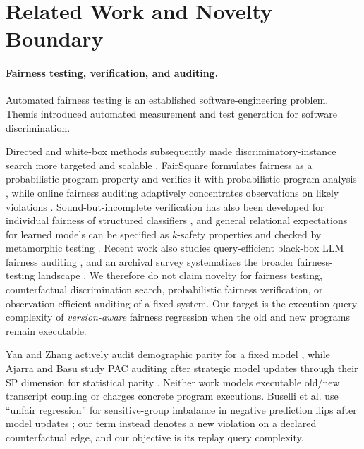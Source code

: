 \section{Related Work and Novelty Boundary}
\label{sec:related}

\paragraph{Fairness testing, verification, and auditing.}
Automated fairness testing is an established software-engineering problem.
Themis \cite{GalhotraBrunMeliou2017} introduced automated measurement and test
generation for software discrimination.

\noindent Directed and white-box methods
subsequently made discriminatory-instance search more targeted and scalable
\cite{UdeshiAroraChattopadhyay2018,ZhangEtAl2020}.  FairSquare formulates
fairness as a probabilistic program property and verifies it with
probabilistic-program analysis \cite{AlbarghouthiEtAl2017}, while online
fairness auditing adaptively concentrates observations on likely violations
\cite{ManerikerBurleyParthasarathy2023}.  Sound-but-incomplete verification has
also been developed for individual fairness of structured classifiers
\cite{GeorgeJohnVijaykeerthySaha2020}, and general relational expectations for
learned models can be specified as \(k\)-safety properties and checked by
metamorphic testing \cite{ChristakisEtAl2023}.  Recent work also studies
query-efficient black-box LLM fairness auditing \cite{HartmannEtAl2026}, and an
archival survey systematizes the broader fairness-testing landscape
\cite{ChenEtAl2024}.  We therefore do not claim novelty for fairness testing,
counterfactual discrimination search, probabilistic fairness verification, or
observation-efficient auditing of a fixed system.  Our target is the
execution-query complexity of \emph{version-aware} fairness regression when the
old and new programs remain executable.

Yan and Zhang actively audit demographic parity for a fixed model
\cite{YanZhang2022}, while Ajarra and Basu study PAC auditing after strategic
model updates through their SP dimension for statistical parity
\cite{AjarraBasu2026}. Neither work models executable old/new transcript
coupling or charges concrete program executions. Buselli et al. use ``unfair
regression'' for sensitive-group imbalance in negative prediction flips after
model updates \cite{BuselliEtAl2024}; our term instead denotes a new violation
on a declared counterfactual edge, and our objective is its replay query
complexity.

